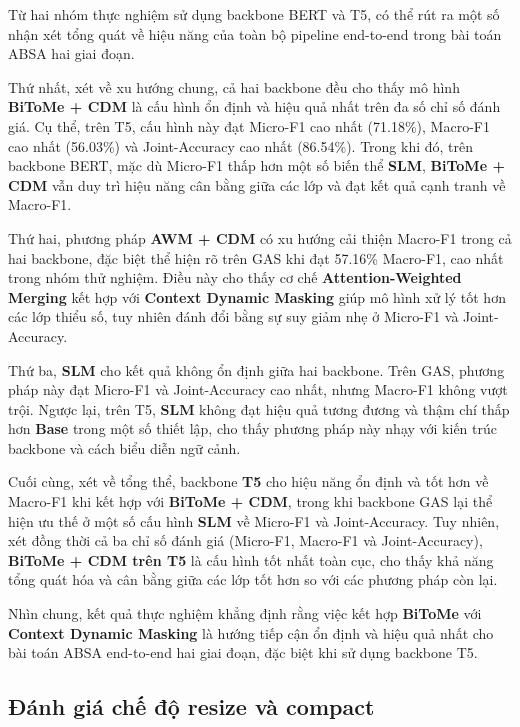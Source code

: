 Từ hai nhóm thực nghiệm sử dụng backbone BERT và T5, có thể rút ra một số nhận xét tổng quát về hiệu năng của toàn bộ pipeline end-to-end trong bài toán ABSA hai giai đoạn.

Thứ nhất, xét về xu hướng chung, cả hai backbone đều cho thấy mô hình \textbf{BiToMe + CDM} là cấu hình ổn định và hiệu quả nhất trên đa số chỉ số đánh giá. Cụ thể, trên T5, cấu hình này đạt Micro-F1 cao nhất (71.18\%), Macro-F1 cao nhất (56.03\%) và Joint-Accuracy cao nhất (86.54\%). Trong khi đó, trên backbone BERT, mặc dù Micro-F1 thấp hơn một số biến thể \textbf{SLM}, \textbf{BiToMe + CDM} vẫn duy trì hiệu năng cân bằng giữa các lớp và đạt kết quả cạnh tranh về Macro-F1.

Thứ hai, phương pháp \textbf{AWM + CDM} có xu hướng cải thiện Macro-F1 trong cả hai backbone, đặc biệt thể hiện rõ trên GAS khi đạt 57.16\% Macro-F1, cao nhất trong nhóm thử nghiệm. Điều này cho thấy cơ chế \textbf{Attention-Weighted Merging} kết hợp với \textbf{Context Dynamic Masking} giúp mô hình xử lý tốt hơn các lớp thiểu số, tuy nhiên đánh đổi bằng sự suy giảm nhẹ ở Micro-F1 và Joint-Accuracy.

Thứ ba, \textbf{SLM} cho kết quả không ổn định giữa hai backbone. Trên GAS, phương pháp này đạt Micro-F1 và Joint-Accuracy cao nhất, nhưng Macro-F1 không vượt trội. Ngược lại, trên T5, \textbf{SLM} không đạt hiệu quả tương đương và thậm chí thấp hơn \textbf{Base} trong một số thiết lập, cho thấy phương pháp này nhạy với kiến trúc backbone và cách biểu diễn ngữ cảnh.

Cuối cùng, xét về tổng thể, backbone \textbf{T5} cho hiệu năng ổn định và tốt hơn về Macro-F1 khi kết hợp với \textbf{BiToMe + CDM}, trong khi backbone GAS lại thể hiện ưu thế ở một số cấu hình \textbf{SLM} về Micro-F1 và Joint-Accuracy. Tuy nhiên, xét đồng thời cả ba chỉ số đánh giá (Micro-F1, Macro-F1 và Joint-Accuracy), \textbf{BiToMe + CDM trên T5} là cấu hình tốt nhất toàn cục, cho thấy khả năng tổng quát hóa và cân bằng giữa các lớp tốt hơn so với các phương pháp còn lại.

Nhìn chung, kết quả thực nghiệm khẳng định rằng việc kết hợp \textbf{BiToMe} với \textbf{Context Dynamic Masking} là hướng tiếp cận ổn định và hiệu quả nhất cho bài toán ABSA end-to-end hai giai đoạn, đặc biệt khi sử dụng backbone T5.
\subsection{Đánh giá chế độ resize và compact}
\label{subsec:compact_vs_resize}

